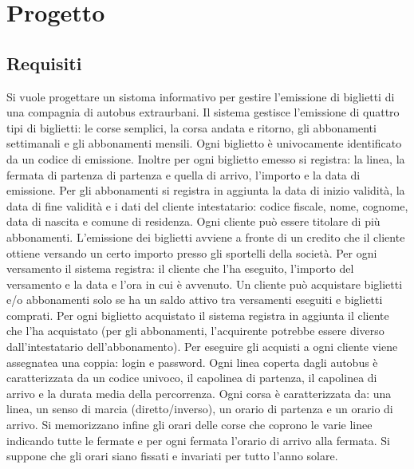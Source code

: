 \documentclass[a4paper,11pt]{book}
\begin{document}
\begin{frontespizio}
\end{frontespizio}

\tableofcontents

\chapter{Progetto}

\section{Requisiti}
Si vuole progettare un sistoma informativo per gestire l'emissione di biglietti di una compagnia di autobus extraurbani.
Il sistema gestisce l'emissione di quattro tipi di biglietti: le corse semplici, la corsa andata e ritorno, gli abbonamenti settimanali e gli abbonamenti mensili. 
Ogni biglietto è univocamente identificato da un codice di emissione. Inoltre per ogni biglietto emesso si registra: la linea, la fermata di partenza di partenza e quella di arrivo, l'importo e la data di emissione. 
Per gli abbonamenti si registra  in aggiunta la data di inizio validità, la data di fine validità e i dati del cliente intestatario: codice fiscale, nome, cognome, data di nascita e comune di residenza. 
Ogni cliente può essere titolare di più abbonamenti. 
L'emissione dei biglietti avviene a fronte di un credito che il cliente ottiene versando un certo importo presso gli sportelli della società.
Per ogni versamento il sistema registra: il cliente che l'ha eseguito, l'importo del versamento e la data e l'ora in cui è avvenuto.
Un cliente può acquistare biglietti e/o abbonamenti solo se ha un saldo attivo tra versamenti eseguiti e biglietti comprati. Per ogni biglietto acquistato il sistema registra in aggiunta il cliente che l'ha acquistato (per gli abbonamenti, l'acquirente potrebbe essere diverso dall'intestatario dell'abbonamento).
Per eseguire gli acquisti a ogni cliente viene assegnatea una coppia: login e password.
Ogni linea coperta dagli autobus è caratterizzata da un codice univoco, il capolinea di partenza, il capolinea di arrivo e la durata media della percorrenza.
Ogni corsa è caratterizzata da: una linea, un senso di marcia (diretto/inverso), un orario di partenza e un orario di arrivo.
Si memorizzano infine gli orari delle corse che coprono le varie linee indicando tutte le fermate e per ogni fermata l'orario di arrivo alla fermata.
Si suppone che gli orari siano fissati e invariati per tutto l'anno solare.
\end{document}
